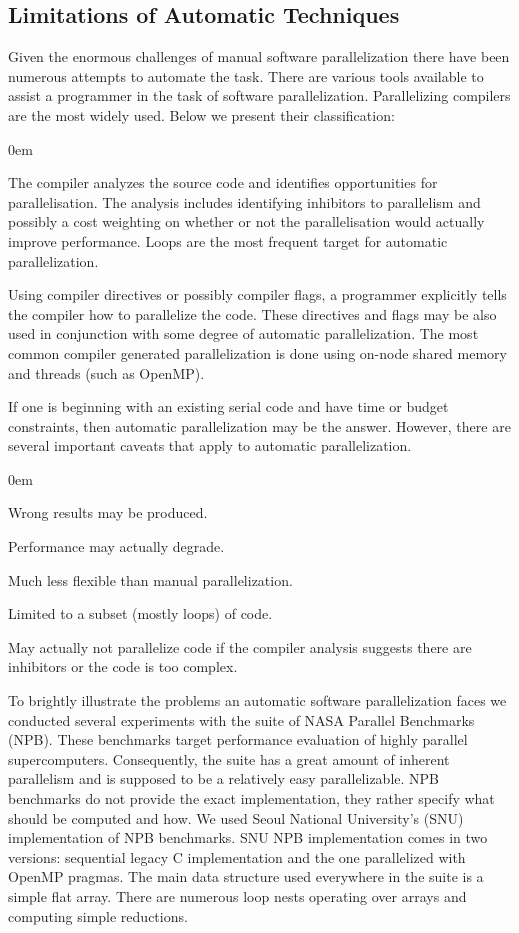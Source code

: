 \subsection{Limitations of Automatic Techniques}
\label{background_challenges_automatic}
\quad Given the enormous challenges of manual software parallelization there have been numerous attempts to automate the task. There are various tools available to assist a programmer in the task of software parallelization. Parallelizing compilers are the most widely used. Below we present their classification:
\begin{description}[style=unboxed,leftmargin=0cm,noitemsep]
\itemsep0em
\item[Fully Automatic] The compiler analyzes the source code and identifies opportunities for parallelisation. The analysis includes identifying inhibitors to parallelism and possibly a cost weighting on whether or not the parallelisation would actually improve performance. Loops are the most frequent target for automatic parallelization. 
\item[Programmer Directed] Using compiler directives or possibly compiler flags, a programmer explicitly tells the compiler how to parallelize the code. These directives and flags may be also used in conjunction with some degree of automatic parallelization. The most common compiler generated parallelization is done using on-node shared memory and threads (such as OpenMP).
\end{description}
\quad If one is beginning with an existing serial code and have time or budget constraints, then automatic parallelization may be the answer. However, there are several important caveats that apply to automatic parallelization.
\begin{description}[style=unboxed,leftmargin=0cm]
\itemsep0em
\item[Correctness] Wrong results may be produced.
\item[Performance] Performance may actually degrade.
\item[Flexibility] Much less flexible than manual parallelization.
\item[Limitations] Limited to a subset (mostly loops) of code.
\item[Effectiveness] May actually not parallelize code if the compiler analysis suggests there are inhibitors or the code is too complex.
\end{description}
\quad To brightly illustrate the problems an automatic software parallelization faces we conducted several experiments with the suite of NASA Parallel Benchmarks (NPB). These benchmarks target performance evaluation of highly parallel supercomputers. Consequently, the suite has a great amount of inherent parallelism and is supposed to be a relatively easy parallelizable. NPB benchmarks do not provide the exact implementation, they rather specify what should be computed and how. We used Seoul National University's (SNU) implementation of NPB benchmarks. SNU NPB implementation comes in two versions: sequential legacy C implementation and the one parallelized with OpenMP pragmas. The main data structure used everywhere in the suite is a simple flat array. There are numerous loop nests operating over arrays and computing simple reductions.\newline\null
